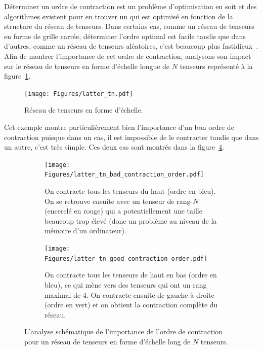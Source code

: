 Déterminer un ordre de contraction est un problème d'optimisation en soit et des algorithmes existent pour en trouver un qui est optimisé en fonction de la structure du réseau de tenseurs.
Dans certains cas, comme un réseau de tenseurs en forme de grille carrée, déterminer l'ordre optimal est facile tandis que dans d'autres, comme un réseau de tenseurs aléatoires, c'est beaucoup plus fastidieux~\cite{gray_hyper-optimized_2022}.
Afin de montrer l'importance de cet ordre de contraction, analysons son impact sur le réseau de tenseurs en forme d'échelle longue de $N$ tenseurs représenté à la figure~\ref{fig:latter-tn}.
\begin{figure}[h]
    \centering
    \texttt{[image: Figures/latter\_tn.pdf]}
    \caption{Réseau de tenseurs en forme d'échelle.}
    \label{fig:latter-tn}
\end{figure}
Cet exemple montre particulièrement bien l'importance d'un bon ordre de contraction puisque dans un cas, il est impossible de le contracter tandis que dans un autre, c'est très simple.
Ces deux cas sont montrés dans la figure~\ref{fig:latter-tn-good-contraction-cases}.
\begin{figure}[h]
    \centering
    \begin{subfigure}{.47\textwidth}
        \centering
        \texttt{[image: Figures/latter\_tn\_bad\_contraction\_order.pdf]}
        \caption{On contracte tous les tenseurs du haut (ordre en bleu). On se retrouve ensuite avec un tenseur de rang-$N$ (encerclé en rouge) qui a potentiellement une taille beaucoup trop élevé (donc un problème au niveau de la mémoire d'un ordinateur).}
        \label{fig:latter-tn-bad-contraction-order}
    \end{subfigure}
    \hspace{0.02\textwidth}
    \begin{subfigure}{.47\textwidth}
        \centering
        \texttt{[image: Figures/latter\_tn\_good\_contraction\_order.pdf]}
        \caption{On contracte tous les tenseurs de haut en bas (ordre en bleu), ce qui mène vers des tenseurs qui ont un rang maximal de $4$. On contracte ensuite de gauche à droite (ordre en vert) et on obtient la contraction complète du réseau.}
        \label{fig:latter-tn-good-contraction-order}
    \end{subfigure}
    \caption{L'analyse schématique de l'importance de l'ordre de contraction pour un réseau de tenseurs en forme d'échelle long de $N$ tenseurs.}
    \label{fig:latter-tn-good-contraction-cases}
\end{figure}

